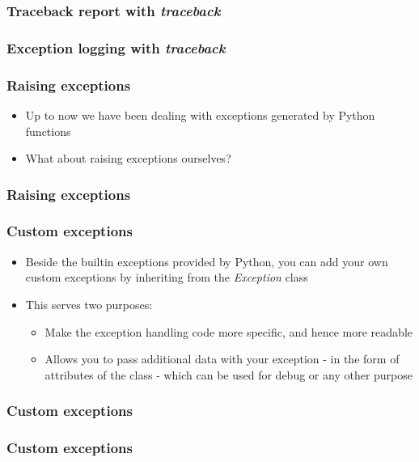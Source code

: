 \documentclass[9pt]{beamer}
\begin{document}
\begin{frame}
  \frametitle{Traceback report with \emph{traceback}}
  
\end{frame}


\begin{frame}
  \frametitle{Exception logging with \emph{traceback}}
  
\end{frame}


\begin{frame}
  \frametitle{Raising exceptions}
  \begin{itemize}
    \item Up to now we have been dealing with exceptions generated by Python
          functions
    \medskip
    \item What about raising exceptions ourselves?
  \end{itemize}
\end{frame}


\begin{frame}
  \frametitle{Raising exceptions}
  
\end{frame}


\begin{frame}
  \frametitle{Custom exceptions}
  \begin{itemize}
    \item Beside the builtin exceptions provided by Python, you can add your
          own custom exceptions by inheriting from the \emph{Exception} class
    \medskip
    \item This serves two purposes:
    \begin{itemize}
      \item Make the exception handling code more specific, and hence more
            readable
      \item Allows you to pass additional data with your exception - in the
            form of attributes of the class - which can be used for debug
            or any other purpose
    \end{itemize}
  \end{itemize}
\end{frame}


\begin{frame}
  \frametitle{Custom exceptions}
  
\end{frame}


\begin{frame}
  \frametitle{Custom exceptions}
  
\end{frame}
\end{document}
